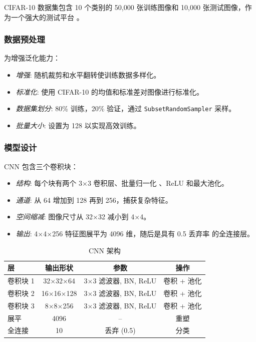 \documentclass[UTF8]{report}
\theoremstyle{MyLineTheoremStyle} %
\theoremstyle{MyBlockTheoremStyle} %
\theoremstyle{MySubsubsectionStyle} %
\begin{document}
CIFAR-10 数据集包含 10 个类别的 50,000 张训练图像和 10,000 张测试图像，作为一个强大的测试平台 \cite{cifar10}。

\subsubsection{数据预处理}

为增强泛化能力：

\begin{itemize}
    \item \textit{增强}: 随机裁剪和水平翻转使训练数据多样化。
    \item \textit{标准化}: 使用 CIFAR-10 的均值和标准差对图像进行标准化。
    \item \textit{数据集划分}: 80\% 训练，20\% 验证，通过 \texttt{SubsetRandomSampler} 采样。
    \item \textit{批量大小}: 设置为 128 以实现高效训练。
\end{itemize}

\subsubsection{模型设计}

CNN 包含三个卷积块：

\begin{itemize}
    \item \textit{结构}: 每个块有两个 3$\times$3 卷积层、批量归一化 \cite{batchnorm}、ReLU 和最大池化。
    \item \textit{通道}: 从 64 增加到 128 再到 256，捕获复杂特征。
    \item \textit{空间缩减}: 图像尺寸从 32$\times$32 减小到 4$\times$4。
    \item \textit{输出}: 4$\times$4$\times$256 特征图展平为 4096 维，随后是具有 0.5 丢弃率 \cite{dropout} 的全连接层。
\end{itemize}

\begin{table}[h]
\centering
\caption{CNN 架构}
\begin{tabular}{l c c c}
\toprule
\textbf{层} & \textbf{输出形状} & \textbf{参数} & \textbf{操作} \\
\midrule
卷积块 1 & 32$\times$32$\times$64 & 3$\times$3 滤波器, BN, ReLU & 卷积 + 池化 \\
卷积块 2 & 16$\times$16$\times$128 & 3$\times$3 滤波器, BN, ReLU & 卷积 + 池化 \\
卷积块 3 & 8$\times$8$\times$256 & 3$\times$3 滤波器, BN, ReLU & 卷积 + 池化 \\
展平 & 4096 & -- & 重塑 \\
全连接 & 10 & 丢弃 (0.5) & 分类 \\
\bottomrule
\end{tabular}
\end{table}
\end{document}

